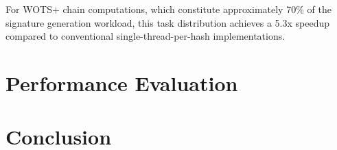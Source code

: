 \documentclass[journal]{IEEEtran}
\begin{document}
For WOTS+ chain computations, which constitute approximately 70\% of the signature generation workload, this task distribution achieves a 5.3x speedup compared to conventional single-thread-per-hash implementations.

\section{Performance Evaluation}\label{sec:evaluation}


\section{Conclusion}\label{sec:conclusion}







\end{document}
